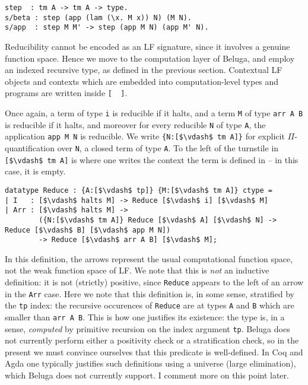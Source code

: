 \documentclass{article}
\begin{document}
\begin{lstlisting}
step  : tm A -> tm A -> type.
s/beta : step (app (lam (\x. M x)) N) (M N).
s/app  : step M M' -> step (app M N) (app M' N).
\end{lstlisting}

Reducibility cannot be encoded as an LF signature, since it
involves a genuine function space. Hence we move to the
computation layer of Beluga, and employ an
indexed recursive type, as defined in the previous section. Contextual LF objects
and contexts which are embedded into computation-level types and programs are 
written inside \lstinline![  ]!. 

Once again, a term of type \lstinline{i} is reducible if it halts, and a term
\lstinline{M} of
type \lstinline{arr A B} is reducible if it halts, and moreover for every
reducible \lstinline{N} of type \lstinline{A}, the application
\lstinline{app M N} is reducible. We write \lstinline!{N:[$\vdash$ tm A]}!
for explicit $\Pi$-quantification over \lstinline{N}, a closed term of type
\lstinline!A!. To the left of the turnstile in \lstinline{[$\vdash$ tm A]} is where
one writes the context the term is defined in -- in this case, it is empty.

\begin{lstlisting}
datatype Reduce : {A:[$\vdash$ tp]} {M:[$\vdash$ tm A]} ctype =
| I   : [$\vdash$ halts M] -> Reduce [$\vdash$ i] [$\vdash$ M]
| Arr : [$\vdash$ halts M] ->
        ({N:[$\vdash$ tm A]} Reduce [$\vdash$ A] [$\vdash$ N] -> Reduce [$\vdash$ B] [$\vdash$ app M N])
        -> Reduce [$\vdash$ arr A B] [$\vdash$ M];
\end{lstlisting}

In this definition, the arrows represent the usual computational
function space, not the weak function space of LF. We note that this
is \emph{not} an inductive definition: it is not (strictly) positive, since \lstinline{Reduce}
appears to the left of an arrow in the \lstinline{Arr} case. Here we note that this
definition is, in some sense, stratified by the \lstinline{tp} index: the recursive occurences of
\lstinline{Reduce} are at types \lstinline{A} and \lstinline{B} which
are smaller than \lstinline{arr A B}. This is how one justifies its
existence: the type is, in a sense, \emph{computed} by primitive
recursion on the index argument \lstinline{tp}. Beluga does not currently perform either a positivity check
or a stratification check, so in the present we must convince ourselves that this
predicate is well-defined. In Coq \citep{bertot/casteran:2004} and Agda
\citep{Norell:phd07} one typically justifies such definitions using a
universe (large elimination), which Beluga does not currently
support. I comment more on this point later.
\end{document}

